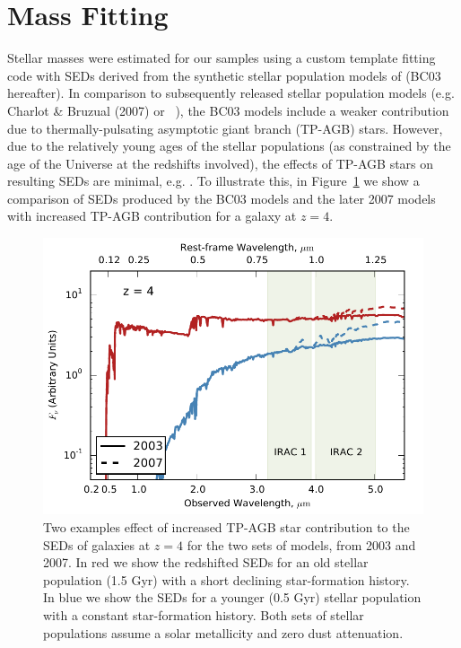 \section{Mass Fitting}\label{smf-sec:masses}
Stellar masses were estimated for our samples using a custom template fitting code with SEDs derived from the synthetic stellar population models of \citet{Bruzual:2003ckb} (BC03 hereafter). In comparison to subsequently released stellar population models (e.g.  Charlot \& Bruzual (2007) or \citeauthor{Maraston:2005er}~\citeyear{Maraston:2005er}), the BC03 models include a weaker contribution due to thermally-pulsating asymptotic giant branch (TP-AGB) stars. However, due to the relatively young ages of the stellar populations (as constrained by the age of the Universe at the redshifts involved), the effects of TP-AGB stars on resulting SEDs are minimal, e.g. \citet{2009ApJ...697.1493S}. To illustrate this, in Figure~\ref{smf-fig:bc_comparison} we show a comparison of SEDs produced by the BC03 models and the later 2007 models with increased TP-AGB contribution for a galaxy at $z = 4$. 

\begin{figure}
\centering
\includegraphics[width=130mm]{plots/BC_comparison.pdf}
\caption[Two examples effect of increased TP-AGB star contribution to the SEDs of galaxies at $z = 4$.]{Two examples effect of increased TP-AGB star contribution to the SEDs of galaxies at $z = 4$ for the two sets of \citeauthor{Bruzual:2003ckb} models, from 2003 and 2007. In red we show the redshifted SEDs for an old stellar population (1.5 Gyr) with a short declining star-formation history. In blue we show the SEDs for a younger (0.5 Gyr) stellar population with a constant star-formation history. Both sets of stellar populations assume a solar metallicity and zero dust attenuation.}
\label{smf-fig:bc_comparison}
\end{figure}

